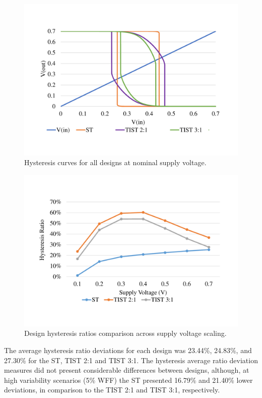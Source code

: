 \documentclass[pgmicro,mestrado,english]{iiufrgs}
\begin{document}
    \begin{figure}[]
        \centering
            \includegraphics[width=1\textwidth, trim={2cm 3cm 2cm 3cm}, clip]{hystGraphs.pdf}
            \caption{Hysteresis curves for all designs at nominal supply voltage.}
        \label{fig:hystCurves}
    \end{figure}

    \begin{figure}[]
        \centering
            \includegraphics[width=1\textwidth, trim={2cm 3cm 2cm 3cm}, clip]{hystRatiosVdd.pdf}
            \caption{Design hysteresis ratios comparison across supply voltage scaling.}
        \label{fig:hystRatiosVdd}
    \end{figure}

    The average hysteresis ratio deviations for each design was 23.44\%, 24.83\%, and 27.30\% for the ST, TIST 2:1 and TIST 3:1. The hysteresis average ratio deviation measures did not present considerable differences between designs, although, at high variability scenarios (5\% WFF) the ST presented 16.79\% and 21.40\% lower deviations, in comparison to the TIST 2:1 and TIST 3:1, respectively.
\end{document}
